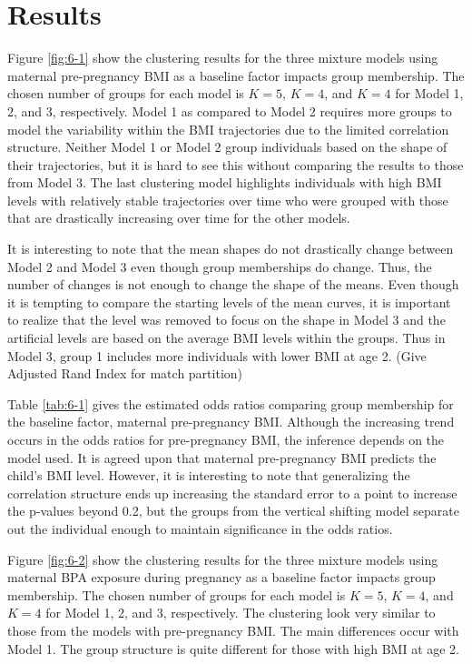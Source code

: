\section{Results}
Figure \ref{fig:6-1} show the clustering results for the three mixture models using maternal pre-pregnancy BMI as a baseline factor impacts group membership. The chosen number of groups for each model is $K = 5$, $K=4$, and $K=4$ for Model 1, 2, and 3, respectively. Model 1 as compared to Model 2 requires more groups to model the variability within the BMI trajectories due to the limited correlation structure. Neither Model 1 or Model 2 group individuals based on the shape of their trajectories, but it is hard to see this without comparing the results to those from Model 3. The last clustering model highlights individuals with high BMI levels with relatively stable trajectories over time who were grouped with those that are drastically increasing over time for the other models. 

It is interesting to note that the mean shapes do not drastically change between Model 2 and Model 3 even though group memberships do change. Thus, the number of changes is not enough to change the shape of the means. Even though it is tempting to compare the starting levels of the mean curves, it is important to realize that the level was removed to focus on the shape in Model 3 and the artificial levels are based on the average BMI levels within the groups. Thus in Model 3, group 1 includes more individuals with lower BMI at age 2. (Give Adjusted Rand Index for match partition)

Table \ref{tab:6-1} gives the estimated odds ratios comparing group membership for the baseline factor, maternal pre-pregnancy BMI. Although the increasing trend occurs in the odds ratios for pre-pregnancy BMI, the inference depends on the model used. It is agreed upon that maternal pre-pregnancy BMI predicts the child's BMI level. However, it is interesting to note that generalizing the correlation structure ends up increasing the standard error to a point to increase the p-values beyond 0.2, but the groups from the vertical shifting model separate out the individual enough to maintain significance in the odds ratios. 

Figure \ref{fig:6-2} show the clustering results for the three mixture models using maternal BPA exposure during pregnancy as a baseline factor impacts group membership. The chosen number of groups for each model is $K = 5$, $K=4$, and $K=4$ for Model 1, 2, and 3, respectively. The clustering look very similar to those from the models with pre-pregnancy BMI. The main differences occur with Model 1. The group structure is quite different for those with high BMI at age 2.

